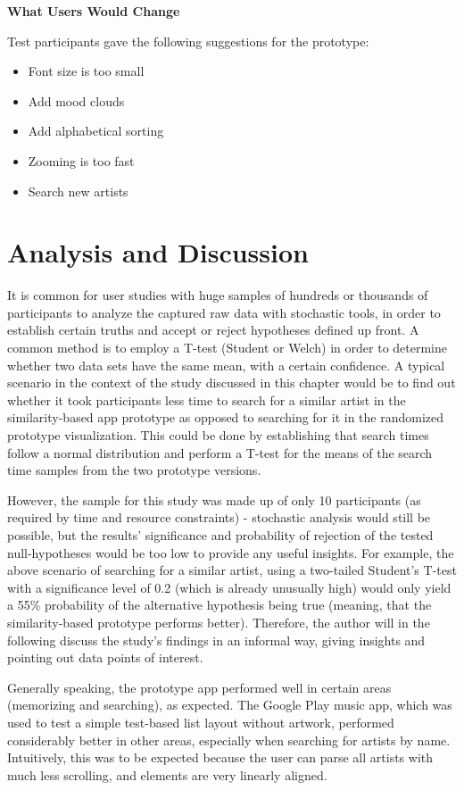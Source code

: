 \textbf{What Users Would Change}

Test participants gave the following suggestions for the prototype:

\begin{itemize}
	\item Font size is too small
	\item Add mood clouds
	\item Add alphabetical sorting
	\item Zooming is too fast
	\item Search new artists
\end{itemize}

\section{Analysis and Discussion}

It is common for user studies with huge samples of hundreds or thousands of participants to analyze the captured raw data with stochastic tools, in order to establish certain truths and accept or reject hypotheses defined up front. A common method is to employ a T-test (Student or Welch) in order to determine whether two data sets have the same mean, with a certain confidence. A typical scenario in the context of the study discussed in this chapter would be to find out whether it took participants less time to search for a similar artist in the similarity-based app prototype as opposed to searching for it in the randomized prototype visualization. This could be done by establishing that search times follow a normal distribution and perform a T-test for the means of the search time samples from the two prototype versions.

However, the sample for this study was made up of only 10 participants (as required by time and resource constraints) - stochastic analysis would still be possible, but the results' significance and probability of rejection of the tested null-hypotheses would be too low to provide any useful insights. For example, the above scenario of searching for a similar artist, using a two-tailed Student's T-test with a significance level of 0.2 (which is already unusually high) would only yield a 55\% probability of the alternative hypothesis being true (meaning, that the similarity-based prototype performs better). Therefore, the author will in the following discuss the study's findings in an informal way, giving insights and pointing out data points of interest.

Generally speaking, the prototype app performed well in certain areas (memorizing and searching), as expected. The Google Play music app, which was used to test a simple test-based list layout without artwork, performed considerably better in other areas, especially when searching for artists by name. Intuitively, this was to be expected because the user can parse all artists with much less scrolling, and elements are very linearly aligned.

